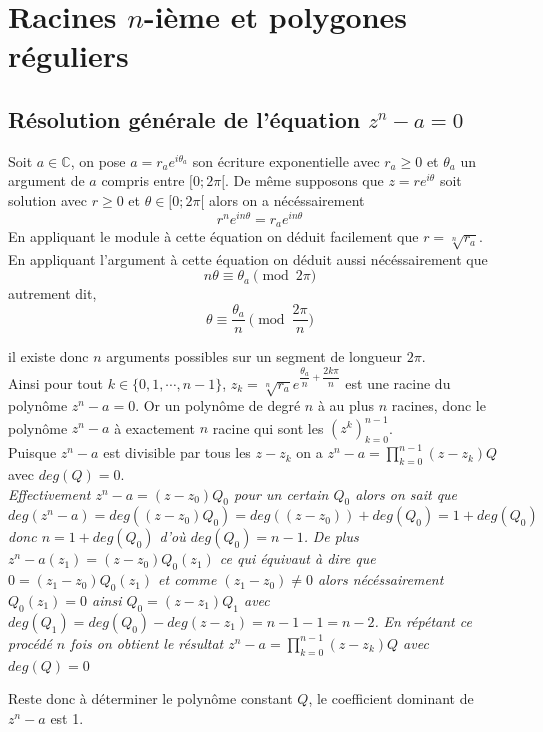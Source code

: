 \documentclass[french]{book}
\newcommand{\se}{\geq}
\begin{document}
\section{Racines $n$-ième et polygones réguliers}

\subsection{Résolution générale de l'équation $z^n-a=0$}
Soit $a\in \mathbb{C}$, on pose $a=r_ae^{i\theta_a}$ son écriture exponentielle avec $r_a \se 0$ et $\theta_a$ un argument de $a$ compris entre $[0;2\pi[$. De même supposons que $z=re^{i\theta}$ soit solution avec $r \se 0$ et $\theta \in [0;2\pi[$
alors on a nécéssairement 
$$r^ne^{in\theta}=r_ae^{in\theta}$$ 
En appliquant le module à cette équation on déduit facilement que $r=\sqrt[n]{r_a}$.\\

En appliquant l'argument à cette équation on déduit aussi nécéssairement que $$n\theta \equiv \theta_a \pmod {2\pi}$$
autrement dit, 
$$\theta \equiv \dfrac{\theta_a}{n} \pmod {\dfrac{2\pi}{n}}$$

il existe donc $n$ arguments possibles sur un segment de longueur $2\pi$.\\

Ainsi pour tout $k\in\{0,1,\cdots,n-1\}$, $z_k=\sqrt[n]{r_a}e^{  \dfrac{\theta_a}{n} +\dfrac{2k\pi}{n} } $ est une racine du polynôme $z^n-a=0$. Or un polynôme de degré $n$ à au plus $n$ racines, donc le polynôme $z^n-a$ à exactement $n$ racine qui sont les $(z^k)^{n-1}_{k=0}$. \\

Puisque $z^n-a$ est divisible par tous les $z-z_k$ on a $z^n-a=\prod^{n-1}_{k=0}(z-z_k)Q$ avec $deg(Q)=0$. \\

\textit{Effectivement $z^n-a=(z-z_0)Q_0$ pour un certain $Q_0$ alors on sait que $deg(z^n-a)=deg((z-z_0)Q_0)=deg((z-z_0))+deg(Q_0)=1+deg(Q_0)$ donc $n=1+deg(Q_0)$ d'où $deg(Q_0)=n-1$.}
\textit{De plus $z^n-a(z_1)=(z-z_0)Q_0(z_1)$ ce qui équivaut à dire que $0=(z_1-z_0)Q_0(z_1)$ et comme $(z_1-z_0)\neq 0$ alors nécéssairement $Q_0(z_1)=0$ ainsi $Q_0=(z-z_1)Q_1$ avec $deg(Q_1)=deg(Q_0)-deg(z-z_1)=n-1-1=n-2$.}
\textit{En répétant ce procédé $n$ fois on obtient le résultat $z^n-a=\prod^{n-1}_{k=0}(z-z_k)Q$ avec $deg(Q)=0$}

Reste donc à déterminer le polynôme constant $Q$, le coefficient dominant de $z^n-a$ est 1. \\
\end{document}
